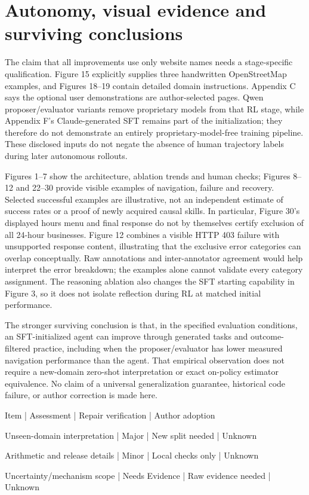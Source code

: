 \documentclass[10pt]{article}
\begin{document}
\section*{Autonomy, visual evidence and surviving conclusions}
The claim that all improvements use only website names needs a stage-specific qualification. Figure 15 explicitly supplies three handwritten OpenStreetMap examples, and Figures 18–19 contain detailed domain instructions. Appendix C says the optional user demonstrations are author-selected pages. Qwen proposer/evaluator variants remove proprietary models from that RL stage, while Appendix F’s Claude-generated SFT remains part of the initialization; they therefore do not demonstrate an entirely proprietary-model-free training pipeline. These disclosed inputs do not negate the absence of human trajectory labels during later autonomous rollouts.\par
Figures 1–7 show the architecture, ablation trends and human checks; Figures 8–12 and 22–30 provide visible examples of navigation, failure and recovery. Selected successful examples are illustrative, not an independent estimate of success rates or a proof of newly acquired causal skills. In particular, Figure 30’s displayed hours menu and final response do not by themselves certify exclusion of all 24-hour businesses. Figure 12 combines a visible HTTP 403 failure with unsupported response content, illustrating that the exclusive error categories can overlap conceptually. Raw annotations and inter-annotator agreement would help interpret the error breakdown; the examples alone cannot validate every category assignment. The reasoning ablation also changes the SFT starting capability in Figure 3, so it does not isolate reflection during RL at matched initial performance.\par
The stronger surviving conclusion is that, in the specified evaluation conditions, an SFT-initialized agent can improve through generated tasks and outcome-filtered practice, including when the proposer/evaluator has lower measured navigation performance than the agent. That empirical observation does not require a new-domain zero-shot interpretation or exact on-policy estimator equivalence. No claim of a universal generalization guarantee, historical code failure, or author correction is made here.\par
Item | Assessment | Repair verification | Author adoption\par
Unseen-domain interpretation | Major | New split needed | Unknown\par
Arithmetic and release details | Minor | Local checks only | Unknown\par
Uncertainty/mechanism scope | Needs Evidence | Raw evidence needed | Unknown\par
\end{document}
